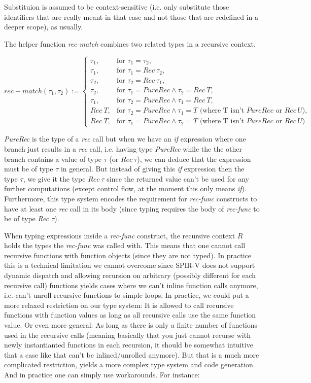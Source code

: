 \documentclass[letterpaper,12pt]{article}
\begin{document}
Substituion is assumed to be context-sensitive (i.e. only substitute those
identifiers that are really meant in that case and not those that are
redefined in a deeper scope), as usually.

The helper function \textit{rec-match} combines two related types in a
recursive context. 

\[
	rec-match(\tau_1, \tau_2) := 
	\begin{cases}
		\tau_1, & \text{for } \tau_1 = \tau_2, \\
		\tau_1, & \text{for } \tau_1 = Rec\:\tau_2, \\
		\tau_2, & \text{for } \tau_2 = Rec\:\tau_1, \\
		\tau_2, & \text{for } \tau_1 = PureRec \land \tau_2 = Rec\:T, \\
		\tau_1, & \text{for } \tau_2 = PureRec \land \tau_1 = Rec\: T, \\
		Rec\:T, &  \text{for } \tau_2 = PureRec \land \tau_1 = T \text{ (where T isn't $PureRec$ or $Rec\, U$)}, \\
		Rec\:T, &  \text{for } \tau_1 = PureRec \land \tau_2 = T \text{ (where T isn't $PureRec$ or $Rec\, U$)}
	\end{cases}
\]

\textit{PureRec} is the type of a \textit{rec} call but
when we have an \textit{if} expression where one branch just results
in a \textit{rec} call, i.e. having type \textit{PureRec} while the
the other branch contains a  value of type $\tau$ (or $Rec\: \tau$), we can deduce 
that the expression must be of type $\tau$ in general.
But instead of giving this \textit{if} expression then the type $\tau$,
we give it the type $Rec\: \tau$ since the returned value can't be used
for any further computations (except control flow, at the moment this
only means \textit{if}). Furthermore, this type system encodes
the requirement for \textit{rec-func} constructs to have at least one
\textit{rec} call in its body (since typing requires the body of \textit{rec-func}
to be of type \textit{Rec $\tau$}).

When typing expressions inside a \textit{rec-func} construct, the recursive 
context $R$ holds the types the \textit{rec-func} was called with. This means
that one cannot call recursive functions with function objects (since they
are not typed). In practice
this is a technical limitation we cannot overcome since SPIR-V does not support
dynamic dispatch and allowing recursion on arbitrary (possibly different
for each recursive call) functions yields cases where we can't inline
function calls anymore, i.e. can't unroll recursive functions to simple loops.
In practice, we could put a more relaxed restriction on our type system:
It is allowed to call recursive functions with function values as long
as all recursive calls use the same function value. Or even more general:
As long as there is only a finite number of functions used in the
recursive calls (meaning basically that you just cannot recurse with newly
instantianted functions in each recursion, it should be somewhat intuitive
that a case like that can't be inlined/unrolled anymore). But that
is a much more complicated restriction, yields a more complex type system
and code generation. And in practice one can simply use workarounds.
For instance:
\end{document}
